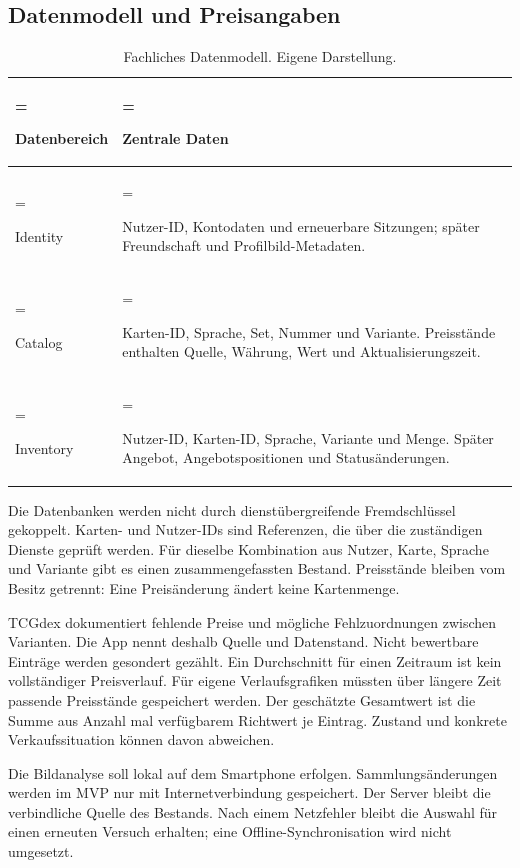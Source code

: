 \subsection{Datenmodell und Preisangaben}
\begin{table}[H]
\centering
\small
\begin{tabularx}{\linewidth}{@{}>{\hsize=0.5\hsize\linewidth=\hsize\raggedright\arraybackslash}X >{\hsize=1.5\hsize\linewidth=\hsize\raggedright\arraybackslash}X@{}}
\toprule
\textbf{Datenbereich} & \textbf{Zentrale Daten} \\
\midrule
Identity & Nutzer-ID, Kontodaten und erneuerbare Sitzungen; später Freundschaft und Profilbild-Metadaten. \\
Catalog & Karten-ID, Sprache, Set, Nummer und Variante. Preisstände enthalten Quelle, Währung, Wert und Aktualisierungszeit. \\
Inventory & Nutzer-ID, Karten-ID, Sprache, Variante und Menge. Später Angebot, Angebotspositionen und Statusänderungen. \\
\bottomrule
\end{tabularx}
\caption{Fachliches Datenmodell. Eigene Darstellung.}
\end{table}
Die Datenbanken werden nicht durch dienstübergreifende Fremdschlüssel gekoppelt. Karten- und Nutzer-IDs sind Referenzen, die über die zuständigen Dienste geprüft werden. Für dieselbe Kombination aus Nutzer, Karte, Sprache und Variante gibt es einen zusammengefassten Bestand. Preisstände bleiben vom Besitz getrennt: Eine Preisänderung ändert keine Kartenmenge.

TCGdex dokumentiert fehlende Preise und mögliche Fehlzuordnungen zwischen Varianten. Die App nennt deshalb Quelle und Datenstand. Nicht bewertbare Einträge werden gesondert gezählt. Ein Durchschnitt für einen Zeitraum ist kein vollständiger Preisverlauf. Für eigene Verlaufsgrafiken müssten über längere Zeit passende Preisstände gespeichert werden. Der geschätzte Gesamtwert ist die Summe aus Anzahl mal verfügbarem Richtwert je Eintrag. Zustand und konkrete Verkaufssituation können davon abweichen. \cite{preise,preisfaq}

Die Bildanalyse soll lokal auf dem Smartphone erfolgen. Sammlungsänderungen werden im MVP nur mit Internetverbindung gespeichert. Der Server bleibt die verbindliche Quelle des Bestands. Nach einem Netzfehler bleibt die Auswahl für einen erneuten Versuch erhalten; eine Offline-Synchronisation wird nicht umgesetzt.

